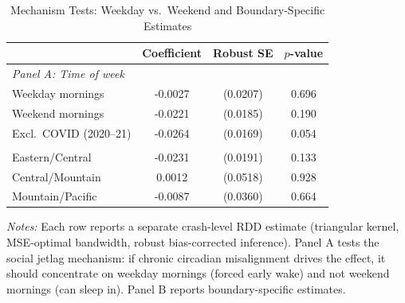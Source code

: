 \begin{table}[htbp]
\centering
\caption{Mechanism Tests: Weekday vs.\ Weekend and Boundary-Specific Estimates}
\label{tab:mechanism}
\begin{threeparttable}
\begin{tabular}{lccc}
\toprule
 & Coefficient & Robust SE & $p$-value \\
\midrule
\multicolumn{4}{l}{\textit{Panel A: Time of week}} \\
\addlinespace
Weekday mornings & -0.0027 & (0.0207) & 0.696 \\
Weekend mornings & -0.0221 & (0.0185) & 0.190 \\
\addlinespace
Excl.\ COVID (2020--21) & -0.0264 & (0.0169) & 0.054 \\
\addlinespace
\multicolumn{4}{l}{\textit{Panel B: By boundary}} \\
\addlinespace
Eastern/Central & -0.0231 & (0.0191) & 0.133 \\
Central/Mountain & 0.0012 & (0.0518) & 0.928 \\
Mountain/Pacific & -0.0087 & (0.0360) & 0.664 \\
\bottomrule
\end{tabular}
\begin{tablenotes}[flushleft]\small
\item \textit{Notes:} Each row reports a separate crash-level RDD estimate (triangular kernel, MSE-optimal bandwidth, robust bias-corrected inference). Panel A tests the social jetlag mechanism: if chronic circadian misalignment drives the effect, it should concentrate on weekday mornings (forced early wake) and not weekend mornings (can sleep in). Panel B reports boundary-specific estimates.
\end{tablenotes}
\end{threeparttable}
\end{table}

